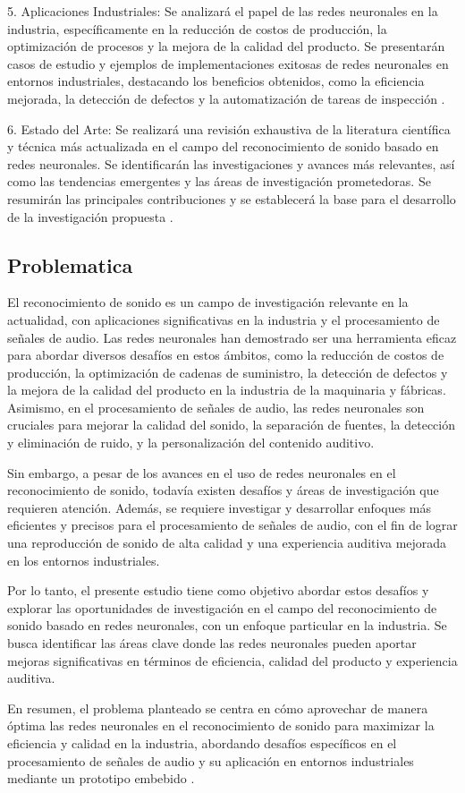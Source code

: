 5. Aplicaciones Industriales: Se analizará el papel de las redes neuronales en la industria, específicamente en la reducción de costos de producción, la optimización de procesos y la mejora de la calidad del producto. Se presentarán casos de estudio y ejemplos de implementaciones exitosas de redes neuronales en entornos industriales, destacando los beneficios obtenidos, como la eficiencia mejorada, la detección de defectos y la automatización de tareas de inspección \cite{garciamurillo, gtocoma,cevallos,ehu}.

6. Estado del Arte: Se realizará una revisión exhaustiva de la literatura científica y técnica más actualizada en el campo del reconocimiento de sonido basado en redes neuronales. Se identificarán las investigaciones y avances más relevantes, así como las tendencias emergentes y las áreas de investigación prometedoras. Se resumirán las principales contribuciones y se establecerá la base para el desarrollo de la investigación propuesta \cite{scribd}.
\newpage
\subsection{Problematica}

El reconocimiento de sonido es un campo de investigación relevante en la actualidad, con aplicaciones significativas en la industria y el procesamiento de señales de audio. Las redes neuronales han demostrado ser una herramienta eficaz para abordar diversos desafíos en estos ámbitos, como la reducción de costos de producción, la optimización de cadenas de suministro, la detección de defectos y la mejora de la calidad del producto en la industria de la maquinaria y fábricas. Asimismo, en el procesamiento de señales de audio, las redes neuronales son cruciales para mejorar la calidad del sonido, la separación de fuentes, la detección y eliminación de ruido, y la personalización del contenido auditivo.

Sin embargo, a pesar de los avances en el uso de redes neuronales en el reconocimiento de sonido, todavía existen desafíos y áreas de investigación que requieren atención. Además, se requiere investigar y desarrollar enfoques más eficientes y precisos para el procesamiento de señales de audio, con el fin de lograr una reproducción de sonido de alta calidad y una experiencia auditiva mejorada en los entornos industriales.

Por lo tanto, el presente estudio tiene como objetivo abordar estos desafíos y explorar las oportunidades de investigación en el campo del reconocimiento de sonido basado en redes neuronales, con un enfoque particular en la industria. Se busca identificar las áreas clave donde las redes neuronales pueden aportar mejoras significativas en términos de eficiencia, calidad del producto y experiencia auditiva.

En resumen, el problema planteado se centra en cómo aprovechar de manera óptima las redes neuronales en el reconocimiento de sonido para maximizar la eficiencia y calidad en la industria, abordando desafíos específicos en el procesamiento de señales de audio y su aplicación en entornos industriales mediante un prototipo embebido \cite{agudoestudio, atriaredes, garciamendoza, gomezarmenta, openwebinars, seorl2014audiologia}.
